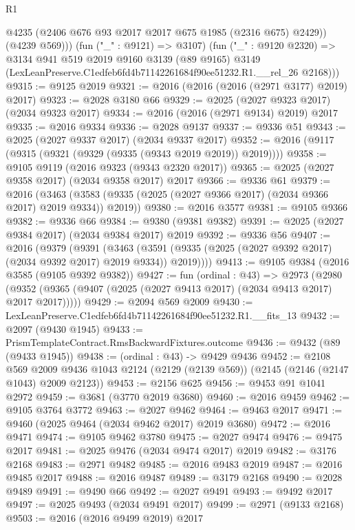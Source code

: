 \begin{lexlean}{R1}
\begin{coremodule}
            @4235
            (@2406 @676 @93 @2017 @2017 @675 @1985 (@2316 @675) @2429))
          (@4239 @569)))
      (fun ("_" : @9121) => @3107)
      (fun ("_" : @9120 @2320) =>
      @3134
        @941
        @519
        @2019
        @9160
        @3139
        (@89 @9165)
        @3149
        (LexLeanPreserve.C1edfeb6fd4b71142261684f90ee51232.R1.__rel_26 @2168)))
@9315 := @9125 @2019
@9321 := @2016 (@2016 (@2016 (@2971 @3177) @2019) @2017)
@9323 := @2028 @3180 @66
@9329 := @2025 (@2027 @9323 @2017) (@2034 @9323 @2017)
@9334 := @2016 (@2016 (@2971 @9134) @2019) @2017
@9335 := @2016 @9334
@9336 := @2028 @9137
@9337 := @9336 @51
@9343 := @2025 (@2027 @9337 @2017) (@2034 @9337 @2017)
@9352 := @2016 (@9117 (@9315 (@9321 (@9329 (@9335 (@9343 @2019 @2019)) @2019))))
@9358 := @9105 @9119 (@2016 @9323 (@9343 @2320 @2017))
@9365 := @2025 (@2027 @9358 @2017) (@2034 @9358 @2017) @2017
@9366 := @9336 @61
@9379 := @2016
    (@3463 (@3583 (@9335 (@2025 (@2027 @9366 @2017) (@2034 @9366 @2017) @2019 @9334)) @2019))
@9380 := @2016 @3577
@9381 := @9105 @9366
@9382 := @9336 @66
@9384 := @9380 (@9381 @9382)
@9391 := @2025 (@2027 @9384 @2017) (@2034 @9384 @2017) @2019
@9392 := @9336 @56
@9407 := @2016
    (@9379
      (@9391
        (@3463 (@3591 (@9335 (@2025 (@2027 @9392 @2017) (@2034 @9392 @2017) @2019 @9334)) @2019))))
@9413 := @9105 @9384 (@2016 @3585 (@9105 @9392 @9382))
@9427 := fun (ordinal : @43) =>
  @2973 (@2980 (@9352 (@9365 (@9407 (@2025 (@2027 @9413 @2017) (@2034 @9413 @2017) @2017 @2017)))))
@9429 := @2094 @569 @2009
@9430 := LexLeanPreserve.C1edfeb6fd4b71142261684f90ee51232.R1.__fits_13
@9432 := @2097 (@9430 @1945)
@9433 := PrismTemplateContract.RmsBackwardFixtures.outcome
@9436 := @9432 (@89 (@9433 @1945))
@9438 := (ordinal : @43) -> @9429 @9436
@9452 := @2108
    @569
    @2009
    @9436
    @1043
    @2124
    (@2129 (@2139 @569))
    (@2145 (@2146 (@2147 @1043) @2009 @2123))
@9453 := @2156 @625
@9456 := @9453 @91 @1041 @2972
@9459 := @3681 (@3770 @2019 @3680)
@9460 := @2016 @9459
@9462 := @9105 @3764 @3772
@9463 := @2027 @9462
@9464 := @9463 @2017
@9471 := @9460 (@2025 @9464 (@2034 @9462 @2017) @2019 @3680)
@9472 := @2016 @9471
@9474 := @9105 @9462 @3780
@9475 := @2027 @9474
@9476 := @9475 @2017
@9481 := @2025 @9476 (@2034 @9474 @2017) @2019
@9482 := @3176 @2168
@9483 := @2971 @9482
@9485 := @2016 @9483 @2019
@9487 := @2016 @9485 @2017
@9488 := @2016 @9487
@9489 := @3179 @2168
@9490 := @2028 @9489
@9491 := @9490 @66
@9492 := @2027 @9491
@9493 := @9492 @2017
@9497 := @2025 @9493 (@2034 @9491 @2017)
@9499 := @2971 (@9133 @2168)
@9503 := @2016 (@2016 @9499 @2019) @2017

\end{coremodule}
\end{lexlean}
